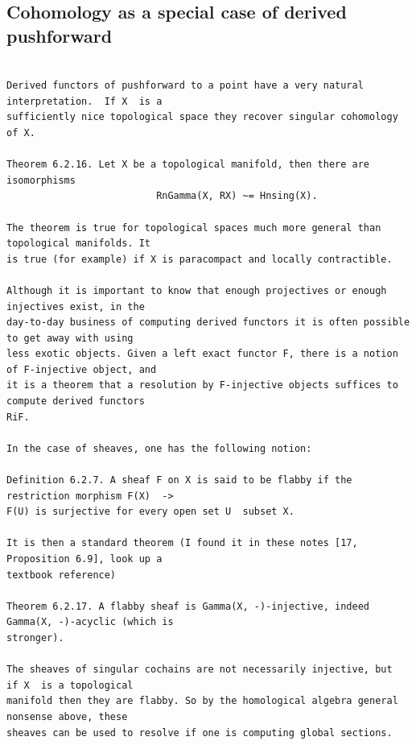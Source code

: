 \subsection{Cohomology as a special case of derived pushforward}
\label{subsection-jethro-cech-7}
\begin{Verbatim}[fontsize=\footnotesize]

Derived functors of pushforward to a point have a very natural interpretation.  If X  is a
sufficiently nice topological space they recover singular cohomology of X.

Theorem 6.2.16. Let X be a topological manifold, then there are isomorphisms
                          RnGamma(X, RX) ~= Hnsing(X).

The theorem is true for topological spaces much more general than topological manifolds. It
is true (for example) if X is paracompact and locally contractible.

Although it is important to know that enough projectives or enough injectives exist, in the
day-to-day business of computing derived functors it is often possible to get away with using
less exotic objects. Given a left exact functor F, there is a notion of F-injective object, and
it is a theorem that a resolution by F-injective objects suffices to compute derived functors
RiF.

In the case of sheaves, one has the following notion:

Definition 6.2.7. A sheaf F on X is said to be flabby if the restriction morphism F(X)  -> 
F(U) is surjective for every open set U  subset X.

It is then a standard theorem (I found it in these notes [17, Proposition 6.9], look up a
textbook reference)

Theorem 6.2.17. A flabby sheaf is Gamma(X, -)-injective, indeed Gamma(X, -)-acyclic (which is
stronger).

The sheaves of singular cochains are not necessarily injective, but  if X  is a topological
manifold then they are flabby. So by the homological algebra general nonsense above, these
sheaves can be used to resolve if one is computing global sections.


\end{Verbatim}
